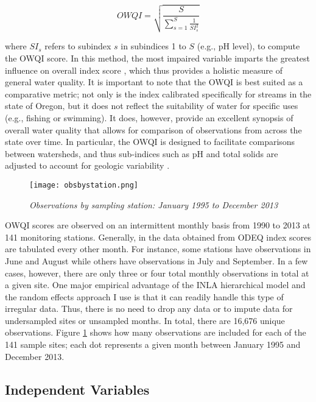 \documentclass[11pt,a4paper,titlepage]{article}
\begin{document}
\begin{equation}
OWQI = \sqrt{\frac{S}{\sum_{s=1}^{S}\frac{1}{SI^{2}_{s}}}}
\label{eq:owqi}
\end{equation}

where $SI_s$ refers to subindex $s$ in subindices 1 to $S$ (e.g., pH level), to compute the OWQI score. In this method, the most impaired variable imparts the greatest influence on overall index score \parencite{cude2001}, which thus provides a holistic measure of general water quality. It is important to note that the OWQI is best suited as a comparative metric; not only is the index calibrated specifically for streams in the state of Oregon, but it does not reflect the suitability of water for specific uses (e.g., fishing or swimming).  It does, however, provide an excellent synopsis of overall water quality that allows for comparison of observations from across the state over time. In particular, the OWQI is designed to facilitate comparisons between watersheds, and thus sub-indices such as pH and total solids are adjusted to account for geologic variability \parencite{cude2001}.

\begin{figure}[!htbp]
\graphicspath{ {`/Users/TScott/Google\space Drive/quinalt/APPAM_2014/'}}
\noindent
\texttt{[image: obsbystation.png]}
\label{fig:dataplot}
\caption{\textit{Observations by sampling station: January 1995 to December 2013}}
\end{figure}

OWQI scores are observed on an intermittent monthly basis from 1990 to 2013 at 141 monitoring stations. Generally, in the data obtained from ODEQ index scores are tabulated every other month. For instance, some stations have observations in June and August while others have observations in July and September. In a few cases, however, there are only three or four total monthly observations in total at a given site. One major empirical advantage of the INLA hierarchical model and the random effects approach I use is that it can readily handle this type of irregular data. Thus, there is no need to drop any data or to impute data for undersampled sites or unsampled months. In total, there are 16,676 unique observations. Figure \ref{fig:dataplot} shows how many observations are included for each of the 141 sample sites; each dot represents a given month between January 1995 and December 2013. 

\subsection*{Independent Variables}
\end{document}
